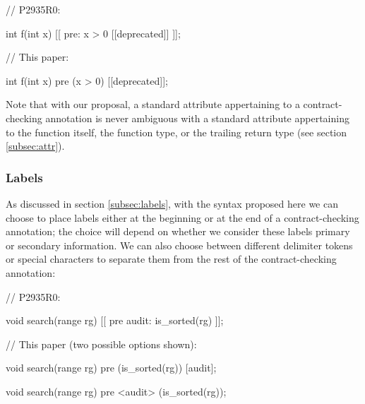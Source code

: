 \begin{minipage}[t]{8cm}
\begin{codeblock}
// P2935R0:

int f(int x) 
  [[ pre: x > 0 [[deprecated]] ]];
\end{codeblock}
\end{minipage}
\begin{minipage}[t]{8cm}
\begin{codeblock}
// This paper:

int f(int x) 
  pre (x > 0) [[deprecated]];
\end{codeblock}
\end{minipage}
\vspace{5mm}

Note that with our proposal, a standard attribute appertaining to a contract-checking annotation is never ambiguous with a standard attribute appertaining to the function itself, the function type, or the trailing return type (see section \ref{subsec:attr}).

\subsubsection{Labels}

As discussed in section \ref{subsec:labels}, with the syntax proposed here we can choose to place labels either at the beginning or at the end of a contract-checking annotation; the choice will depend on whether we consider these labels primary or secondary information. We can also choose between different delimiter tokens or special characters to separate them from the rest of the contract-checking annotation:

\begin{minipage}[t]{8cm}
\begin{codeblock}
// P2935R0:

void search(range rg)
  [[ pre audit: is_sorted(rg) ]];
\end{codeblock}
\end{minipage}
\begin{minipage}[t]{8cm}
\begin{codeblock}
// This paper (two possible options shown):

void search(range rg)
  pre (is_sorted(rg)) [audit];
  
void search(range rg)
  pre <audit> (is_sorted(rg));
\end{codeblock}
\end{minipage}
\vspace{3mm}

